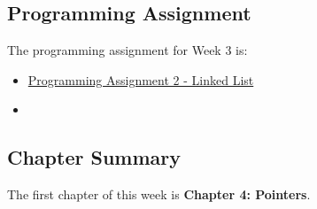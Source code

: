 \subsection{Programming Assignment}

The programming assignment for Week 3 is:

\begin{itemize}
    \item \href{https://github.com/QuantumCompiler/CU/tree/main/CSPB%202270%20-%20Data%20Structures/Assignments/Assignment%202%20-%20Linked%20List}{Programming Assignment 2 - Linked List}
    \item {}
\end{itemize}

\newpage

\subsection{Chapter Summary}

The first chapter of this week is \textbf{Chapter 4: Pointers}.

